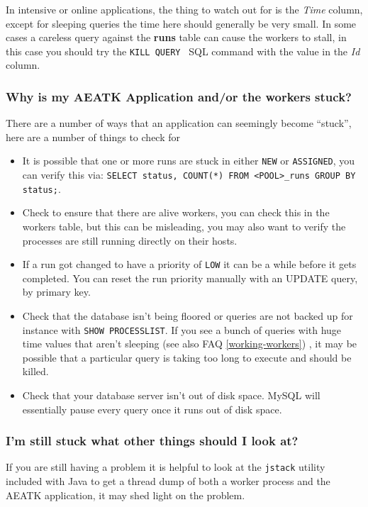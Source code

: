 \documentclass[11pt,letterpaper,oneside]{article}
\begin{document}
In intensive or online applications, the thing to watch out for is the \textit{Time} column, except for sleeping queries the time here should generally be very small. In some cases a careless query against the \textbf{runs} table can cause the workers to stall, in this case you should try the \texttt{KILL QUERY } SQL command with the value in the \textit{Id} column.

\subsubsection{Why is my AEATK Application and/or the workers stuck?}

There are a number of ways that an application can seemingly become ``stuck'', here are a number of things to check for

\begin{itemize}
\item It is possible that one or more runs are stuck in either \texttt{NEW} or \texttt{ASSIGNED}, you can verify this via: \texttt{SELECT status, COUNT(*) FROM <POOL>\_runs GROUP BY status;}.
\item Check to ensure that there are alive workers, you can check this in the workers table, but this can be misleading, you may also want to verify the processes are still running directly on their hosts.
\item If a run got changed to have a priority of \texttt{LOW} it can be a while before it gets completed. You can reset the run priority manually with an UPDATE query, by primary key.
\item Check that the database isn't being floored or queries are not backed up for instance with \texttt{SHOW PROCESSLIST}. If you see a bunch of queries with huge time values that aren't sleeping (see also FAQ \ref{working-workers}) , it may be possible that a particular query is taking too long to execute and should be killed.
\item Check that your database server isn't out of disk space. MySQL will essentially pause every query once it runs out of disk space.
\end{itemize}

\subsubsection{I'm still stuck what other things should I look at?}

If you are still having a problem it is helpful to look at the \texttt{jstack} utility included with Java to get a thread dump of both a worker process and the AEATK application, it may shed light on the problem.
\end{document}
